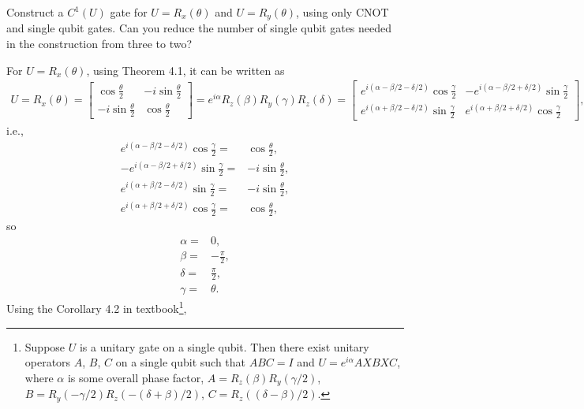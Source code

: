 \documentclass[en]{sol-man}
\begin{document}
\begin{exe}
    Construct a $C^1(U)$ gate for $U=R_x(\theta)$ and $U=R_y(\theta)$, using only CNOT and single qubit gates. Can you reduce the number of single qubit gates needed in the construction from three to two?
\end{exe}
\begin{sol}
    For $U=R_x(\theta)$, using Theorem 4.1, it can be written as
    \begin{align}
        U=R_x(\theta)=\begin{bmatrix}
            \cos\frac{\theta}{2}&-i\sin\frac{\theta}{2}\\
            -i\sin\frac{\theta}{2}&\cos\frac{\theta}{2}
        \end{bmatrix}=e^{i\alpha}R_z(\beta)R_y(\gamma)R_z(\delta)=\begin{bmatrix}
            e^{i(\alpha-\beta/2-\delta/2)}\cos\frac{\gamma}{2}&-e^{i(\alpha-\beta/2+\delta/2)}\sin\frac{\gamma}{2}\\
            e^{i(\alpha+\beta/2-\delta/2)}\sin\frac{\gamma}{2}&e^{i(\alpha+\beta/2+\delta/2)}\cos\frac{\gamma}{2}
        \end{bmatrix},
    \end{align}
    i.e.,
    \begin{align}
        e^{i(\alpha-\beta/2-\delta/2)}\cos\frac{\gamma}{2}=&\cos\frac{\theta}{2},\\
        -e^{i(\alpha-\beta/2+\delta/2)}\sin\frac{\gamma}{2}=&-i\sin\frac{\theta}{2},\\
        e^{i(\alpha+\beta/2-\delta/2)}\sin\frac{\gamma}{2}=&-i\sin\frac{\theta}{2},\\
        e^{i(\alpha+\beta/2+\delta/2)}\cos\frac{\gamma}{2}=&\cos\frac{\theta}{2},
    \end{align}
    so
    \begin{align}
        \alpha=&0,\\
        \beta=&-\frac{\pi}{2},\\
        \delta=&\frac{\pi}{2},\\
        \gamma=&\theta.
    \end{align}
    Using the Corollary 4.2 in textbook\footnote{Suppose $U$ is a unitary gate on a single qubit. Then there exist unitary operators $A$, $B$, $C$ on a single qubit such that $ABC=I$ and $U=e^{i\alpha}AXBXC$, where $\alpha$ is some overall phase factor, $A=R_z(\beta)R_y(\gamma/2)$, $B=R_y(-\gamma/2)R_z(-(\delta+\beta)/2)$, $C=R_z((\delta-\beta)/2)$.\label{Cor-4.2-U=exp(i alpha)AXBXC}},

\end{sol}
\end{document}
